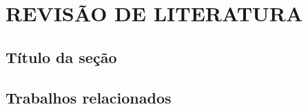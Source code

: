 
\chapter{REVISÃO DE LITERATURA}
\label{chap:revisaodeliteratura}

\lipsum[3-5] %


\section{Título da seção}
\label{sec:labelSecao}

\lipsum[10] %

\section{Trabalhos relacionados}
\label{sec:trabalhosrelacionados}

\lipsum[11-12] %
